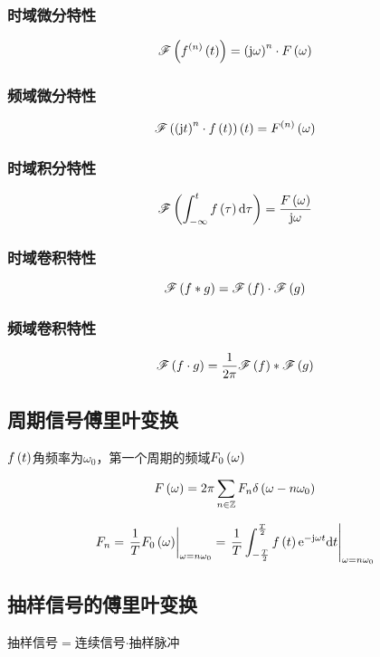 \documentclass{article}
\begin{document}
\subsubsection{时域微分特性}

\[\mathscr F\left(f^{\left(n\right)}\left(t\right)\right)=\left(\mathrm j\omega\right)^n\cdot F\left(\omega\right)\]

\subsubsection{频域微分特性}

\[\mathscr F\left(\left(\mathrm j t\right)^n\cdot f\left(t\right)\right)\left(t\right)=F^{\left(n\right)}\left(\omega\right)\]

\subsubsection{时域积分特性}

\[\mathscr F\left(\int_{-\infty}^tf\left(\tau\right)\mathrm d\tau\right)=\frac{F\left(\omega\right)}{\mathrm j\omega}\]

\subsubsection{时域卷积特性}

\[\mathscr F\left(f\ast g\right)=\mathscr F\left(f\right)\cdot\mathscr F\left(g\right)\]

\subsubsection{频域卷积特性}

\[\mathscr F\left(f\cdot g\right)=\frac1{2\pi}\mathscr F\left(f\right)\ast\mathscr F\left(g\right)\]

\subsection{周期信号傅里叶变换}

$f\left(t\right)$角频率为$\omega_0$，第一个周期的频域$F_0\left(\omega\right)$

\[F\left(\omega\right)=2\pi\sum_{n\in\mathbb Z} F_n\delta\left(\omega-n\omega_0\right)\]

\[F_n=\left.\frac1TF_0\left(\omega\right)\right|_{\omega=n\omega_0}=\left.\frac1T\int_{-\frac T2}^{\frac T2}f\left(t\right)\mathrm e^{-\mathrm j\omega t}\mathrm d t\right|_{\omega=n\omega_0}\]

\subsection{抽样信号的傅里叶变换}

抽样信号$=$连续信号$\cdot$抽样脉冲
\end{document}
